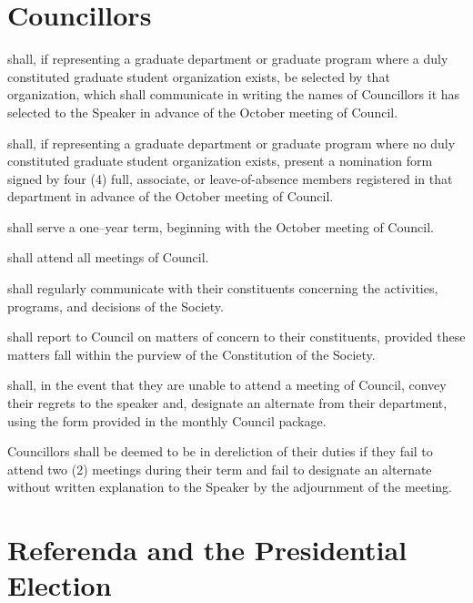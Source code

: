 \section{Councillors}
\begin{longenum}[ label*=\thesection.\arabic*., align=left]
	\item shall, if representing a graduate department or graduate program where a duly constituted graduate student organization exists, be selected by that organization, which shall communicate in writing the names of Councillors it has selected to the Speaker in advance of the October meeting of Council. 
    \item shall, if representing a graduate department or graduate program where no duly constituted graduate student organization  exists, present a nomination form signed by four (4) full, associate, or leave-of-absence members registered in that department in advance of the October meeting of Council. 
    \item shall serve a one--year term, beginning with the October meeting of Council. 
    \item shall attend all meetings of Council.
    \item shall regularly communicate with their constituents concerning the activities, programs, and decisions of the Society. 
    \item shall report to Council on matters of concern to their constituents, provided these matters fall within the purview of the Constitution of the Society. 
    \item shall, in the event that they are unable to attend a meeting of Council, convey their regrets to the speaker and, designate an alternate from their department, using the form provided in the monthly Council package.
    \item Councillors shall be deemed to be in dereliction of their duties if they fail to attend two (2) meetings during their term and fail to designate an alternate without written explanation to the Speaker by the adjournment  of the meeting. 
\end{longenum}
\newpage
\section{Referenda and the Presidential Election}
 

